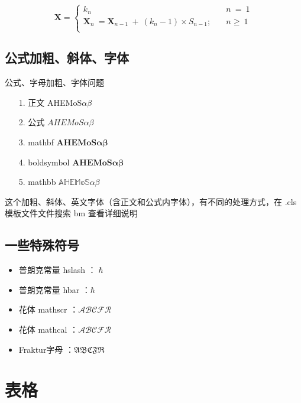 \documentclass[AutoFakeBold]{LZUThesis-PgD&PhD}
\begin{document}
\begin{equation}\label{eq:multi}
    \mathbf{X}=
    \begin{cases}
        k_n \quad & n \ = \ 1  \\
        \mathbf{X}_n \ = \mathbf{X}_{n-1}\ +\ (k_n-1)\times S_{n-1};
        \quad     & n \geq \ 1 \\
    \end{cases}
\end{equation}

\subsection{公式加粗、斜体、字体}

公式、字母加粗、字体问题

\begin{itemize}
    \item[1.] 正文 \qquad \quad AHEMoS$\alpha \beta$
    \item[2.] 公式 \qquad \quad $AHEMoS \alpha \beta$
    \item[3.] mathbf \qquad $\mathbf{AHEMoS\alpha \beta}$
    \item[4.] boldsymbol $\boldsymbol{AHEMoS\alpha \beta}$
    \item[5.] mathbb \qquad $\mathbb{AHEMoS\alpha \beta}$
\end{itemize}

这个加粗、斜体、英文字体（含正文和公式内字体），有不同的处理方式，在 .cls 模板文件文件搜索 bm 查看详细说明

\subsection{一些特殊符号}

\begin{itemize}
    \item 普朗克常量 hslash ：$\hslash$
    \item 普朗克常量 hbar ：$\hbar$
    \item 花体 mathscr ：$\mathscr{ABCFR}$
    \item 花体 mathcal ：$\mathcal{ABCFR}$
    \item Fraktur字母 ：$\mathfrak{ABCFR}$
\end{itemize}


\section{表格}
\end{document}
